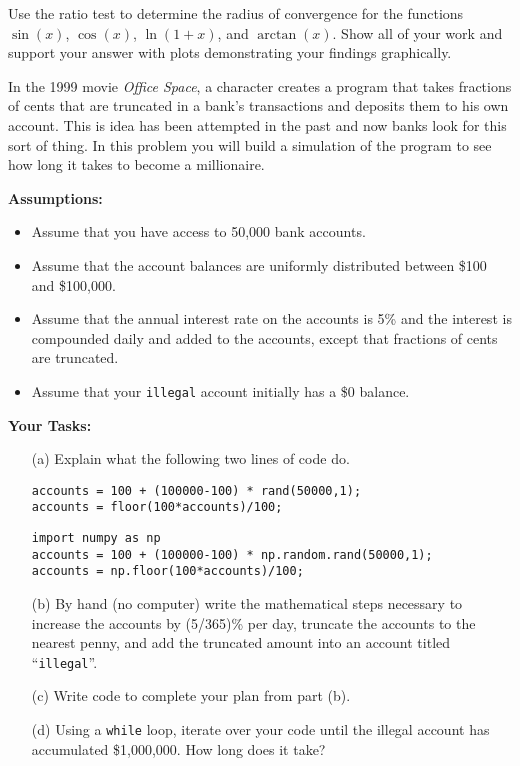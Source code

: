 \begin{problem}
    Use the ratio test to determine the radius of convergence for the functions $\sin(x)$, $\cos(x)$,
    $\ln(1+x)$, and $\arctan(x)$.  Show all of your work and support your answer with
    plots demonstrating your findings graphically.
\end{problem}

\begin{problem}
    In the 1999 movie {\it Office Space}, a character creates a program that takes
    fractions of cents that are truncated in a bank's transactions and deposits them to
    his own account.  This is idea has been attempted in the past and now banks
    look for this sort of thing.  In this problem you will build a simulation of the
    program to see how long it takes to become a millionaire.  

    {\bf Assumptions:}
    \begin{itemize}
        \item Assume that you have access to 50,000 bank accounts.
        \item Assume that the account balances are uniformly distributed between
            \$100 and \$100,000.
        \item Assume that the annual interest rate on the accounts is 5\% and the interest
            is compounded daily and added to the accounts, except that fractions of cents
            are truncated.
        \item Assume that your \texttt{illegal} account initially has a \$0 balance.
    \end{itemize}

    {\bf Your Tasks:}
    \begin{enumerate}
        \item[(a)] Explain what the following two lines of \ProgLang code do.
            \ifnum{}
\begin{lstlisting}
accounts = 100 + (100000-100) * rand(50000,1);
accounts = floor(100*accounts)/100;
\end{lstlisting}
\else
\begin{lstlisting}
import numpy as np
accounts = 100 + (100000-100) * np.random.rand(50000,1);
accounts = np.floor(100*accounts)/100;
\end{lstlisting}
\fi
        \item[(b)] By hand (no computer) write the mathematical steps necessary to
            increase the accounts by (5/365)\% per day, truncate the accounts to the
            nearest penny, and add the truncated amount into an account titled
            ``\texttt{illegal}''.
        \item[(c)] Write code to complete your plan from part (b).
        \item[(d)] Using a \texttt{while} loop, iterate over your code until the illegal
            account has accumulated \$1,000,000.  How long does it take?
    \end{enumerate}
\end{problem}
